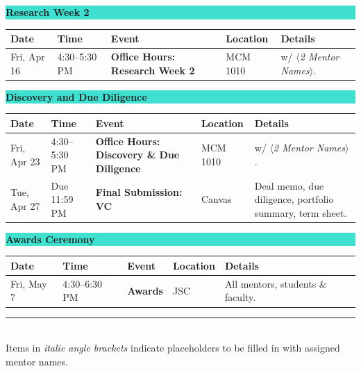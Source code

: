 \documentclass[11pt]{article}
\newcommand{\weekheader}[1]{%
  \vspace{4pt}
  \noindent
  \colorbox{turquoise}{\parbox{\dimexpr\textwidth-2\fboxsep}{\bfseries\large #1}}
  \vspace{6pt}
}
\newcommand{\deliverable}[2]{\colorbox{#1}{\textbf{#2}}}
\newcommand{\entry}[5]{%
  #1 & #2 & \textbf{#3} & #4 & #5 \\
}
\begin{document}
\weekheader{Research Week 2}
\begin{longtable}{L{2.2cm} L{2.2cm} L{4.5cm} L{1.7cm} L{4.7cm}}
\toprule
{}
\textbf{Date} & \textbf{Time} & \textbf{Event} & \textbf{Location} & \textbf{Details} \\
\midrule
\entry{Fri, Apr 16}{4:30--5:30 PM}{Office Hours: Research Week 2}{MCM 1010}{w/ \textit{$\langle$2 Mentor Names$\rangle$}.}
\bottomrule
\end{longtable}

\weekheader{Discovery and Due Diligence}
\begin{longtable}{L{2.2cm} L{2.2cm} L{4.5cm} L{1.7cm} L{4.7cm}}
\toprule
{}
\textbf{Date} & \textbf{Time} & \textbf{Event} & \textbf{Location} & \textbf{Details} \\
\midrule
\entry{Fri, Apr 23}{4:30--5:30 PM}{Office Hours: Discovery \& Due Diligence}{MCM 1010}{w/ \textit{$\langle$2 Mentor Names$\rangle$}.}
\addlinespace
\entry{Tue, Apr 27}{Due 11:59 PM}{\deliverable{trackvc}{Final Submission: VC}}{Canvas}{Deal memo, due diligence, portfolio summary, term sheet.}
\bottomrule
\end{longtable}

\weekheader{Awards Ceremony}
\begin{longtable}{L{2.2cm} L{2.2cm} L{4.5cm} L{1.7cm} L{4.7cm}}
\toprule
{}
\textbf{Date} & \textbf{Time} & \textbf{Event} & \textbf{Location} & \textbf{Details} \\
\midrule
\entry{Fri, May 7}{4:30--6:30 PM}{\textbf{Awards}}{JSC}{All mentors, students \& faculty.}
\bottomrule
\end{longtable}

\vspace{10pt}
\noindent\textcolor{rulegray}{\rule{\textwidth}{0.6pt}}\\[4pt]
{\small Items in \textit{italic angle brackets} indicate placeholders to be filled in with assigned mentor names.}
\end{document}
